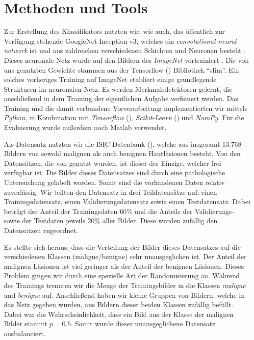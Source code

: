 \section{Methoden und Tools}

Zur Erstellung des Klassifikators nutzten wir, wie \citet{esteva2017dermatologist} auch, das öffentlich zur Verfügung stehende GoogleNet Inception v3, welches ein \textit{convolutional neural network} ist und aus zahlreichen verschiedenen Schichten und Neuronen besteht \citep{szegedy2016rethinking}. Dieses neuronale Netz wurde auf den Bildern des \textit{ImageNet} vortrainiert \citep{russakovsky2015imagenet}. Die von uns genutzten Gewichte stammen aus der Tensorflow (\cite{tensorflow2015-whitepaper}) Bibliothek ``slim''.
Ein solches vorheriges Training auf ImageNet etabliert einige grundlegende Strukturen im neuronalen Netz. Es werden Merkmalsdetektoren gelernt, die anschließend in dem Training der eigentlichen Aufgabe verfeinert werden.  Das Training und die damit verbundene Vorverarbeitung implementierten wir mittels \textit{Python}, in Kombination mit \textit{Tensorflow} (\cite{tensorflow2015-whitepaper}), \textit{Scikit-Learn} (\cite{scikit-learn}) und \textit{NumPy}. Für die Evaluierung wurde außerdem noch Matlab verwendet.

Als Datensatz nutzten wir die ISIC-Datenbank (\cite{ISIC}), welche aus insgesamt 13.768 Bildern von sowohl malignen als auch benignen Hautläsionen besteht. Von den Datensätzen, die von \citet{esteva2017dermatologist} genutzt wurden, ist dieser der Einzige, welcher frei verfügbar ist. Die Bilder dieses Datensatzes sind durch eine pathologische Untersuchung gelabelt worden. Somit sind die vorhandenen Daten relativ zuverlässig. Wir teilten den Datensatz in drei Teildatensätze auf: einen Trainingsdatensatz, einen Validierungsdatensatz sowie einen Testdatensatz. Dabei beträgt der Anteil der Trainingsdaten $60\%$ und die Anteile der Validierungs- sowie der Testdaten jeweils $20\%$ aller Bilder. Diese wurden zufällig den Datensätzen zugeordnet.

Es stellte sich heraus, dass die Verteilung der Bilder dieses Datensatzes auf die verschiedenen Klassen (maligne/benigne) sehr unausgeglichen ist. Der Anteil der malignen Läsionen ist viel geringer als der Anteil der benignen Läsionen. Dieses Problem gingen wir durch eine spezielle Art der Randomisierung an. Während des Trainings trennten wir die Menge der Trainingsbilder in die Klassen \textit{maligne} und \textit{benigne} auf. Anschließend haben wir kleine Gruppen von Bildern, welche in das Netz gegeben wurden, aus Bildern dieser beiden Klassen zufällig befüllt. Dabei war die Wahrscheinlichkeit, dass ein Bild aus der Klasse der malignen Bilder stammt $p=0.5$. Somit wurde dieser unausgeglichene Datensatz ausbalanciert.

